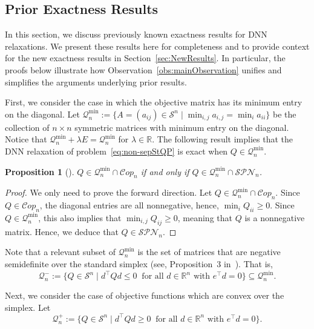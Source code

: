 \documentclass{amsart}
\newcommand{\cS}{\mathcal{S}}
\newcommand{\cQ}{\mathcal{Q}}
\newcommand{\Cop}{\mathcal{C}op}
\newcommand{\SPN}{\mathcal{SPN}}
\newtheorem{proposition}[theorem]{Proposition}
\theoremstyle{definition}
\begin{document}


\subsection{Prior Exactness Results}

In this section, we discuss previously known exactness results for DNN relaxations.
We present these results here for completeness and to provide context for the new exactness results in Section~\ref{sec:NewResults}. In particular, the proofs below illustrate how Observation~\ref{obs:mainObservation} unifies and simplifies the arguments underlying prior results.

First, we consider the case in which the objective matrix has its minimum entry on the diagonal. Let $\cQ_n^{\min} := \{A = (a_{ij})\in \cS^n \; \vert \; \min_{i,j} a_{i,j} = \min_{i} a_{ii}\}$ be the collection of $n\times n$ symmetric matrices with minimum entry on the diagonal. Notice that $\cQ_n^{\min} + \lambda E = \cQ_n^{\min}$ for $\lambda\in\mathbb{R}$.  The following result implies that the DNN relaxation of problem~\eqref{eq:non-sepStQP} is exact when $Q\in\cQ_n^{\min}$. 

\begin{proposition}[{\cite[Proposition 2]{gokmen2022standard}}]
 $Q \in \cQ_n^{\min}\cap\Cop_n $ if and only if $Q \in \cQ_n^{\min} \cap \mathcal{SPN}_n$.
\end{proposition}
\begin{proof}
 We only need to prove the forward direction. Let $Q \in  \cQ_n^{\min}\cap\Cop_n$. Since $Q\in \Cop_n$, the diagonal entries are all nonnegative, hence, $\min_i Q_{ii} \ge 0$. Since $Q\in \cQ_n^{\min}$, this also implies that $\min_{i,j} Q_{ij} \ge 0$, meaning that $Q$ is a nonnegative matrix. Hence, we deduce that $Q\in\SPN_n$.
\end{proof}
Note that a relevant subset of $\cQ_n^{\min}$ is the set of matrices that are negative semidefinite over the standard simplex (see, Proposition~3 in~\cite{gokmen2022standard}). That is,
\[
\cQ_n^- := \{ Q \in \cS^n \;\vert\; d^\top Q d \le 0 \ \text{ for all } d\in \mathbb{R}^n \text{ with } e^\top d = 0\} \subseteq \cQ_n^{\min}.
\]

Next, we consider the case of objective functions which are convex over the simplex. Let 
\[\cQ_n^+ := \{ Q \in \cS^n \; \vert \; d^\top  Q d \ge 0 \ \text{ for all } d\in \mathbb{R}^n \text{ with } e^\top  d = 0\}.\]
\end{document}
